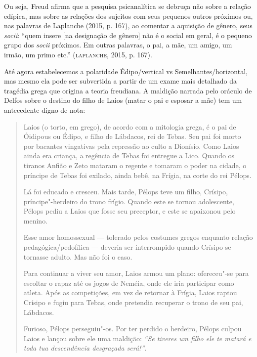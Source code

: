 Ou seja, Freud afirma que a pesquisa psicanalítica se debruça não sobre
a relação edípica, mas sobre as relações dos sujeitos com seus pequenos
outros próximos ou, nas palavras de Laplanche (2015, p. 167), ao
comentar a aquisição de gênero, seus \emph{socii}: ``quem insere {[}na
designação de gênero{]} não é o social em geral, é o pequeno grupo dos
\emph{socii} próximos. Em outras palavras, o pai, a mãe, um amigo, um
irmão, um primo etc.'' (\textsc{laplanche}, 2015, p. 167).

Até agora estabelecemos a polaridade Édipo/vertical vs
Semelhantes/horizontal, mas mesmo ela pode ser subvertida a partir de um
exame mais detalhado da tragédia grega que origina a teoria freudiana. A
maldição narrada pelo oráculo de Delfos sobre o destino do filho de
Laios (matar o pai e esposar a mãe) tem um antecedente digno de nota:

\begin{quote}
Laios (o torto, em grego), de acordo com a mitologia grega, é o pai de
Óidipous ou Édipo, e filho de Lábdacos, rei de Tebas. Seu pai foi morto
por bacantes vingativas pela repressão ao culto a Dionísio. Como Laios
ainda era criança, a regência de Tebas foi entregue a Lico. Quando os
tiranos Anfião e Zeto mataram o regente e tomaram o poder na cidade, o
príncipe de Tebas foi exilado, ainda bebê, na Frígia, na corte do rei
Pélops.

Lá foi educado e cresceu. Mais tarde, Pélops teve um filho, Crísipo,
príncipe"-herdeiro do trono frígio. Quando este se tornou adolescente,
Pélops pediu a Laios que fosse seu preceptor, e este se apaixonou pelo
menino.

Esse amor homossexual --- tolerado pelos costumes gregos enquanto
relação pedagógica/pedofílica --- deveria ser interrompido quando
Crísipo se tornasse adulto. Mas não foi o caso.

Para continuar a viver seu amor, Laios armou um plano: ofereceu"-se para
escoltar o rapaz até os jogos de Neméia, onde ele iria participar como
atleta. Após as competições, em vez de retornar à Frígia, Laios raptou
Crísipo e fugiu para Tebas, onde pretendia recuperar o trono de seu pai,
Lábdacos.

Furioso, Pélops perseguiu"-os. Por ter perdido o herdeiro, Pélops culpou
Laios e lançou sobre ele uma maldição: \emph{``Se tiveres um filho ele
te matará e toda tua descendência desgraçada será!''}.
\end{quote}


